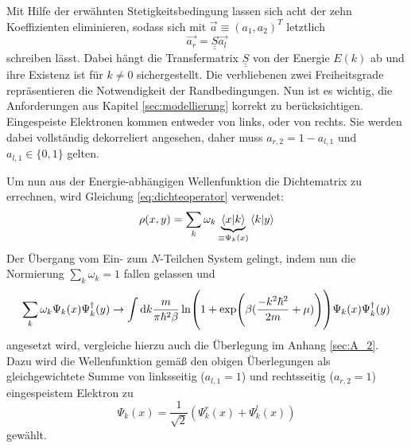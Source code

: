 Mit Hilfe der erwähnten Stetigkeitsbedingung lassen sich acht der zehn Koeffizienten eliminieren, sodass sich mit $\vec{a}\equiv(a_1, a_2)^T$ letztlich
\begin{equation}
  \vec{a_r} = \underline{\underline{S}} \vec{a_l}
\end{equation}
schreiben lässt. Dabei hängt die Transfermatrix $\underline{\underline{S}}$ von der Energie $E(k)$ ab und ihre Existenz ist für $k\neq 0$ sichergestellt.
 Die verbliebenen zwei Freiheitsgrade repräsentieren die Notwendigkeit der Randbedingungen. Nun ist es wichtig, die Anforderungen aus Kapitel \ref{sec:modellierung} korrekt zu berücksichtigen. Eingespeiste Elektronen kommen entweder von links, oder von rechts. Sie werden dabei vollständig dekorreliert angesehen, daher muss ${a_{r,2}=1-a_{l,1}}$ und ${a_{l,1}\in\{0,1\}}$ gelten.

Um nun aus der Energie-abhängigen Wellenfunktion die Dichtematrix zu errechnen, wird Gleichung \eqref{eq:dichteoperator} verwendet:
\begin{equation}
  \rho(x,y) = \sum_k \omega_k \underbrace{\bra{x}\ket{k}}_{\equiv\Psi_k(x)}\bra{k}\ket{y}
\end{equation}
Der Übergang vom Ein- zum $N$-Teilchen System gelingt, indem nun die Normierung $\sum_k \omega_k = 1$ fallen gelassen und
\begin{equation}
  \sum_k \omega_k  \Psi_k(x) \Psi_k^{\dagger}(y) \rightarrow \int \mathop{}\!\mathrm{d} k \frac{m}{\pi\hbar^2\beta} \ln(1+\exp(\beta(\frac{- k^2\hbar^2}{2m} + \mu))) \Psi_k(x) \Psi_k^{\dagger}(y)
\end{equation}
angesetzt wird, vergleiche hierzu auch die Überlegung im Anhang \ref{sec:A_2}. Dazu wird die Wellenfunktion gemäß den obigen Überlegungen als gleichgewichtete Summe von linksseitig (${a_{l,1}=1}$) und rechtsseitig (${a_{r,2}=1}$) eingespeistem Elektron zu
\begin{equation}
  \Psi_k(x) = \frac{1}{\sqrt{2}}(\Psi_k^r(x) + \Psi_k^l(x))
\end{equation}
gewählt.



